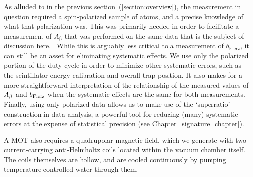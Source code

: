 
% 
As alluded to in the previous section~(\ref{section:overview}), the measurement in question required a spin-polarized sample of atoms, and a precise knowledge of what that polarization was.  This was primarily needed in order to facilitate a measurement of $A_{\mathrm{\beta}}$ 
that was performed on the same data that is the subject of discussion here.~\cite{ben_Abeta}   
While this is arguably less critical to a measurement of $b_{\mathrm{Fierz}}$, it can still be an asset for eliminating systematic effects.    
We use only the polarized portion of the duty cycle in order to minimize other systematic errors, such as the scintillator energy calibration and overall trap position.  It also makes for a more straightforward interpretation of the relationship of the measured values of $A_{\beta}$ and $b_{\mathrm{Fierz}}$ when the systematic effects are the same for both measurements. Finally, using only polarized data allows us to make use of the `superratio' construction in data analysis, a powerful tool for reducing (many) systematic errors at the expense of statistical precision (see Chapter~\ref{signature_chapter}).



A MOT also requires a quadrupolar magnetic field, which we generate with two current-carrying anti-Helmholtz coils located within the vacuum chamber itself.  The coils themselves are hollow, and are cooled continuously by pumping temperature-controlled water through them.   

